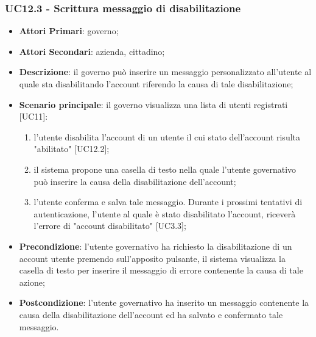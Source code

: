 \subsubsection{UC12.3 - Scrittura messaggio di disabilitazione}
\begin{itemize}
	\item \textbf{Attori Primari}:
	governo;
	\item \textbf{Attori Secondari}:
	azienda, cittadino;
	\item \textbf{Descrizione}: il governo può inserire un messaggio personalizzato all'utente al quale sta disabilitando l'account riferendo la causa di tale disabilitazione;
	\item \textbf{Scenario principale}: il governo visualizza una lista di utenti registrati [UC11]:
	\begin{enumerate}[label=\alph*.]
		\item l'utente disabilita l'account di un utente il cui stato dell'account risulta "abilitato" [UC12.2];
		\item il sistema propone una casella di testo nella quale l'utente governativo può inserire la causa della disabilitazione dell'account;
		\item l'utente conferma e salva tale messaggio. Durante i prossimi tentativi di autenticazione, l'utente al quale è stato disabilitato l'account, riceverà l'errore di "account disabilitato" [UC3.3];
	\end{enumerate}
	 
	\item \textbf{Precondizione}: l'utente governativo ha richiesto la disabilitazione di un account utente premendo sull'apposito pulsante, il sistema visualizza la casella di testo per inserire il messaggio di errore contenente la causa di tale azione;
	\item \textbf{Postcondizione}: l'utente governativo ha inserito un messaggio contenente la causa della disabilitazione dell'account ed ha salvato e confermato tale messaggio.
\end{itemize}


